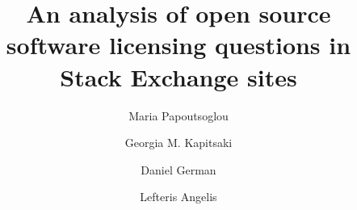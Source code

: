 \documentclass{elsarticle}
\begin{document}
\begin{frontmatter}


\title{An analysis of open source software licensing questions in Stack Exchange sites
}
\author[1]{Maria Papoutsoglou}
\author[2]{Georgia M. Kapitsaki}
\author[3]{Daniel German}
\author[1]{Lefteris Angelis}


\address[1]{Aristotle University of Thessaloniki, Thessaloniki, 541 24, Greece}
\address[2]{University of Cyprus, 1, University Avenue, Aglantzia, 2109, Cyprus}
\address[3]{University of Victoria, Victoria, BC V8P 5C2, Canada}


\end{frontmatter}
\end{document}

